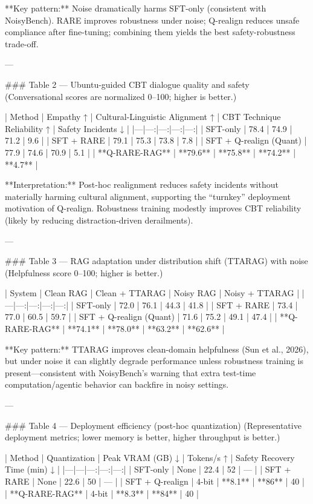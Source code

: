 **Key pattern:** Noise dramatically harms SFT-only (consistent with NoisyBench). RARE improves robustness under noise; Q-realign reduces unsafe compliance after fine-tuning; combining them yields the best safety-robustness trade-off.

---

### Table 2 — Ubuntu-guided CBT dialogue quality and safety  
(Conversational scores are normalized 0–100; higher is better.)

| Method | Empathy ↑ | Cultural-Linguistic Alignment ↑ | CBT Technique Reliability ↑ | Safety Incidents ↓ |
|---|---:|---:|---:|---:|
| SFT-only | 78.4 | 74.9 | 71.2 | 9.6 |
| SFT + RARE | 79.1 | 75.3 | 73.8 | 7.8 |
| SFT + Q-realign (Quant) | 77.9 | 74.6 | 70.9 | 5.1 |
| **Q-RARE-RAG** | **79.6** | **75.8** | **74.2** | **4.7** |

**Interpretation:** Post-hoc realignment reduces safety incidents without materially harming cultural alignment, supporting the “turnkey” deployment motivation of Q-realign. Robustness training modestly improves CBT reliability (likely by reducing distraction-driven derailments).

---

### Table 3 — RAG adaptation under distribution shift (TTARAG) with noise  
(Helpfulness score 0–100; higher is better.)

| System | Clean RAG | Clean + TTARAG | Noisy RAG | Noisy + TTARAG |
|---|---:|---:|---:|---:|
| SFT-only | 72.0 | 76.1 | 44.3 | 41.8 |
| SFT + RARE | 73.4 | 77.0 | 60.5 | 59.7 |
| SFT + Q-realign (Quant) | 71.6 | 75.2 | 49.1 | 47.4 |
| **Q-RARE-RAG** | **74.1** | **78.0** | **63.2** | **62.6** |

**Key pattern:** TTARAG improves clean-domain helpfulness (Sun et al., 2026), but under noise it can slightly degrade performance unless robustness training is present—consistent with NoisyBench’s warning that extra test-time computation/agentic behavior can backfire in noisy settings.

---

### Table 4 — Deployment efficiency (post-hoc quantization)  
(Representative deployment metrics; lower memory is better, higher throughput is better.)

| Method | Quantization | Peak VRAM (GB) ↓ | Tokens/s ↑ | Safety Recovery Time (min) ↓ |
|---|---|---:|---:|---:|
| SFT-only | None | 22.4 | 52 | — |
| SFT + RARE | None | 22.6 | 50 | — |
| SFT + Q-realign | 4-bit | **8.1** | **86** | 40 |
| **Q-RARE-RAG** | 4-bit | **8.3** | **84** | 40 |

